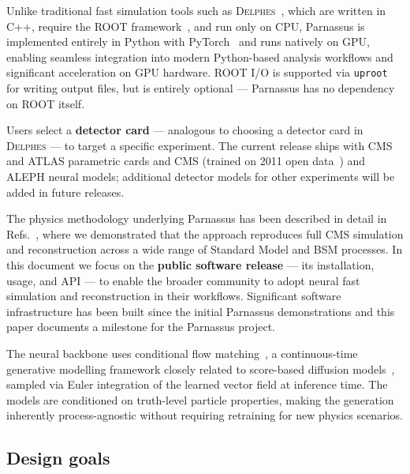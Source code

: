 \documentclass[11pt,a4paper]{article}          %
\begin{document}
Unlike traditional fast simulation tools such as
\textsc{Delphes}~\cite{delphes}, which are written in C++, require the ROOT
framework~\cite{root}, and run only on CPU, Parnassus is implemented entirely
in Python with PyTorch~\cite{pytorch} and runs natively on GPU, enabling seamless integration into modern Python-based analysis workflows
and significant acceleration on GPU hardware. ROOT I/O is supported via
\texttt{uproot}~\cite{uproot} for writing output files, but is entirely
optional --- Parnassus has no dependency on ROOT itself.

Users select a \textbf{detector card} --- analogous to choosing a detector card
in \textsc{Delphes} --- to target a specific experiment. The current release ships with CMS and
  ATLAS parametric cards and CMS (trained on 2011 open data~\cite{cms_opendata}) and ALEPH neural models; additional detector
  models for other experiments will be added in future releases.

The physics methodology underlying Parnassus has been described in detail in
Refs.~\cite{parnassus_v1,parnassus_v2}, where we demonstrated that the approach
reproduces full CMS simulation and reconstruction across a wide range of
Standard Model and BSM processes. In this document we focus on the
\textbf{public software release} --- its installation, usage, and API --- to
enable the broader community to adopt neural fast simulation and
reconstruction in their workflows.  Significant software infrastructure has been built since the initial Parnassus demonstrations and this paper documents a milestone for the Parnassus project.

The neural backbone uses conditional flow
matching~\cite{lipman2023flow,liu2023flow}, a continuous-time generative
modelling framework closely related to score-based diffusion
models~\cite{song2021scorebased,ho2020denoising}, sampled via Euler integration
of the learned vector field at inference time. The models are conditioned on
truth-level particle properties, making the generation inherently
process-agnostic without requiring retraining for new physics scenarios.

\subsection{Design goals}
\end{document}
